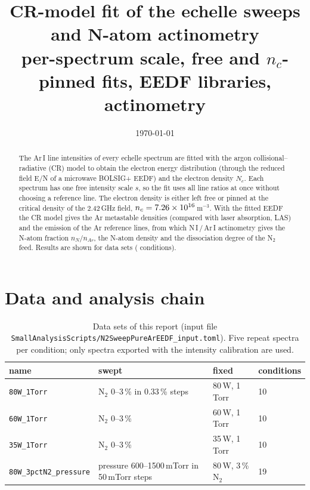 \documentclass[11pt]{article}
\title{CR-model fit of the echelle sweeps and N-atom actinometry\\[2pt]
\large per-spectrum scale, free and $n_c$-pinned fits, EEDF libraries, actinometry}
\author{}
\date{\today}
\newcommand{\EN}{E/N}
\newcommand{\nc}{n_c}
\begin{document}
\maketitle

\begin{abstract}
The Ar\,I line intensities of every echelle spectrum are fitted with the argon collisional--radiative (CR) model to
obtain the electron energy distribution (through the reduced field \EN{} of a microwave BOLSIG+ EEDF) and the
electron density $N_e$. Each spectrum has one free intensity scale $s$, so the fit uses all line ratios at once
without choosing a reference line. The electron density is either left free or pinned at the critical density of
the 2.42\,GHz field, $\nc=\Nc$\,m$^{-3}$. With the fitted EEDF the CR model gives the Ar metastable densities
(compared with laser absorption, LAS) and the emission of the Ar reference lines, from which N\,I\,/\,Ar\,I
actinometry gives the N-atom fraction $n_N/n_{Ar}$, the N-atom density and the dissociation degree of the N$_2$
feed. Results are shown for \NSets{} data sets (\NCond{} conditions).
\end{abstract}

\tableofcontents

\section{Data and analysis chain}
\begin{table}[h]
\centering\small
\caption{Data sets of this report (input file \texttt{SmallAnalysisScripts/N2SweepPureArEEDF\_input.toml}). Five
repeat spectra per condition; only spectra exported with the intensity calibration are used.}
\label{tab:sets}
\begin{tabular}{llll}
\toprule
name & swept & fixed & conditions \\
\midrule
\texttt{80W\_1Torr} & N$_2$ 0--3\,\% in 0.33\,\% steps & 80\,W, 1\,Torr & 10 \\
\texttt{60W\_1Torr} & N$_2$ 0--3\,\% & 60\,W, 1\,Torr & 10 \\
\texttt{35W\_1Torr} & N$_2$ 0--3\,\% & 35\,W, 1\,Torr & 10 \\
\texttt{80W\_3pctN2\_pressure} & pressure 600--1500\,mTorr in 50\,mTorr steps & 80\,W, 3\,\% N$_2$ & 19 \\
\bottomrule
\end{tabular}
\end{table}
\end{document}
